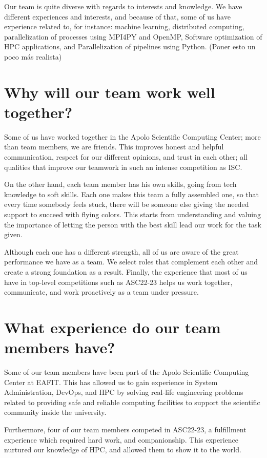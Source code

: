 \documentclass[11pt,a4paper,twocolumn]{article}
\begin{document}
Our team is quite diverse with regards to interests and knowledge. We have different experiences and interests, and because of that, some of us have experience related to, for instance: machine learning, distributed computing, parallelization of processes using MPI4PY and OpenMP, Software optimization of HPC applications, and Parallelization of pipelines using Python. (Poner esto un poco más realista)

\section{Why will our team work well together?}

Some of us have worked together in the Apolo Scientific Computing Center; more than team members, we are friends. This improves honest and helpful communication, respect for our different opinions, and trust in each other; all qualities that improve our teamwork in such an intense competition as ISC. 

On the other hand, each team member has his own skills, going from tech knowledge to soft skills. Each one makes this team a fully assembled one, so that every time somebody feels stuck, there will be someone else giving the needed support to succeed with flying colors. This starts from understanding and valuing the importance of letting the person with the best skill lead our work for the task given.

Although each one has a different strength, all of us are aware of the great performance we have as a team. We select roles that complement each other and create a strong foundation as a result. Finally, the experience that most of us have in top-level competitions such as ASC22-23 helps us work together, communicate, and work proactively as a team under pressure.

\section{What experience do our team members have?}

Some of our team members have been part of the Apolo Scientific Computing Center at EAFIT. This has allowed us to gain experience in System Administration, DevOps, and HPC by solving real-life engineering problems related to providing safe and reliable computing facilities to support the scientific community inside the university. 

Furthermore, four of our team members competed in ASC22-23, a fulfillment experience which required hard work, and companionship. This experience nurtured our knowledge of HPC, and allowed them to show it to the world.
\end{document}
